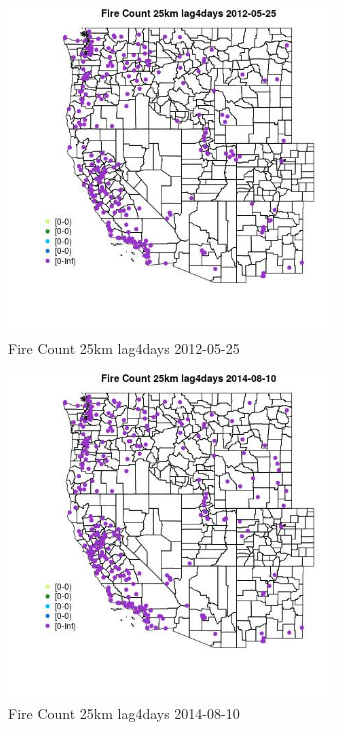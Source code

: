 \begin{figure} 
\centering  
\includegraphics[width=0.77\textwidth]{Code_Outputs/Report_ML_input_PM25_Step4_part_e_de_duplicated_aves_compiled_2019-05-18wNAs_MapObsFire_Count_25km_lag4days2012-05-25.jpg} 
\caption{\label{fig:Report_ML_input_PM25_Step4_part_e_de_duplicated_aves_compiled_2019-05-18wNAsMapObsFire_Count_25km_lag4days2012-05-25}Fire Count 25km lag4days 2012-05-25} 
\end{figure} 
 

\begin{figure} 
\centering  
\includegraphics[width=0.77\textwidth]{Code_Outputs/Report_ML_input_PM25_Step4_part_e_de_duplicated_aves_compiled_2019-05-18wNAs_MapObsFire_Count_25km_lag4days2014-08-10.jpg} 
\caption{\label{fig:Report_ML_input_PM25_Step4_part_e_de_duplicated_aves_compiled_2019-05-18wNAsMapObsFire_Count_25km_lag4days2014-08-10}Fire Count 25km lag4days 2014-08-10} 
\end{figure} 
 


